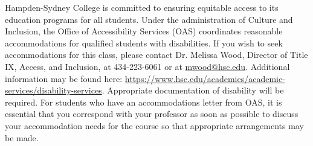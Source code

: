 \documentclass[10pt]{article}
\begin{document}
Hampden-Sydney College is committed to ensuring equitable access to its education programs for all students. Under the administration of Culture and Inclusion, the Office of Accessibility Services (OAS) coordinates reasonable accommodations for qualified students with disabilities. If you wish to seek accommodations for this class, please contact Dr. Melissa Wood, Director of Title IX, Access, and Inclusion, at 434-223-6061 or at \url{mwood@hsc.edu}. Additional information may be found here: \url{https://www.hsc.edu/academics/academic-services/disability-services}. Appropriate documentation of disability will be required. For students who have an accommodations letter from OAS, it is essential that you correspond with your professor as soon as possible to discuss your accommodation needs for the course so that appropriate arrangements may be made.
\end{document}
